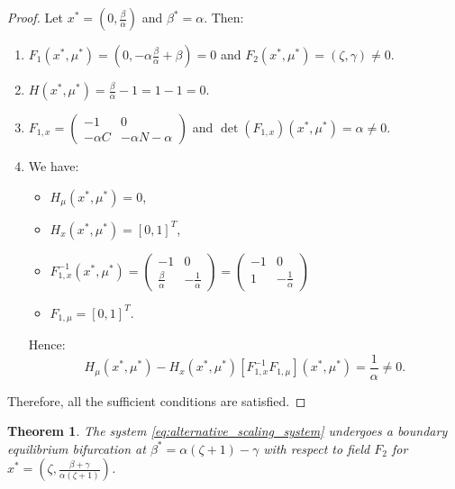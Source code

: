 \documentclass[12pt,a4paper]{article}
\newtheorem{theorem}{Theorem}
\begin{document}
\begin{proof}
    Let $x^*=\left(0, \frac{\beta}{\alpha}\right)$ and $\beta^*=\alpha$. 
    Then:
    \begin{enumerate}
        \item $F_1(x^*, \mu^*) = \left(0, -\alpha \frac{\beta}{\alpha} + \beta\right) = 0 $ and $F_2(x^*, \mu^*)=(\zeta, \gamma) \neq 0.$
        \item $H(x^*, \mu^*)=\frac{\beta}{\alpha} - 1 = 1-1 = 0.$
        \item $F_{1,x} = \begin{pmatrix}
        -1 & 0 \\
        -\alpha C & -\alpha N - \alpha
        \end{pmatrix}$ and $\det(F_{1,x})(x^*, \mu^*) = \alpha \neq 0.$
    \item We have: 
    \begin{itemize}
        \item $H_{\mu}(x^*, \mu^*) = 0$,
        \item $H_x(x^*, \mu^*) = [0, 1]^T$,
        \item $F_{1, x}^{-1}(x^*, \mu^*) = \begin{pmatrix}
        -1 & 0 \\
        \frac{\beta}{\alpha} & -\frac{1}{\alpha}
        \end{pmatrix} = \begin{pmatrix}
        -1 & 0 \\
        1 & -\frac{1}{\alpha}
        \end{pmatrix}$
        \item $F_{1, \mu} = [0, 1]^T.$
    \end{itemize}
    Hence:
    \begin{equation}
        H_{\mu}(x^*,\mu^*) - H_x(x^*,\mu^*)[F_{1,x}^{-1} F_{1, \mu}](x^*,\mu^*) =\frac{1}{\alpha} \neq 0.
    \end{equation}
    \end{enumerate}
    Therefore, all the sufficient conditions are satisfied.
\end{proof}

\begin{theorem}
    The system \eqref{eq:alternative_scaling_system} undergoes a boundary equilibrium bifurcation at $\beta^*=\alpha(\zeta+1) - \gamma$ with respect to field $F_2$ for $x^*=\left(\zeta, \frac{\beta + \gamma}{\alpha (\zeta + 1)}\right)$.
\end{theorem}
\end{document}
